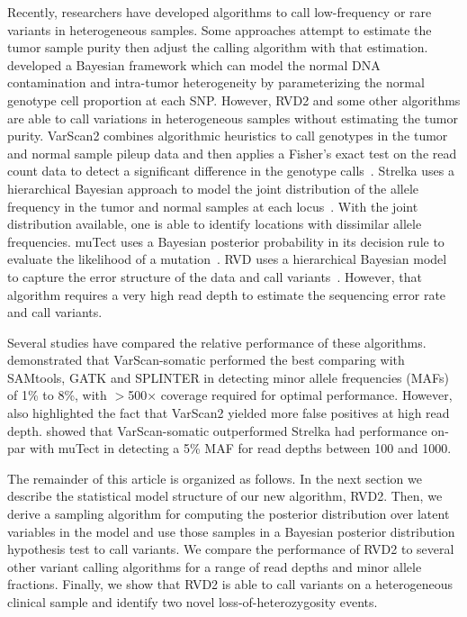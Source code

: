 \documentclass{bioinfo}
\begin{document}
Recently, researchers have developed algorithms to call low-frequency or rare variants in heterogeneous samples. Some approaches attempt to estimate the tumor sample purity then adjust the calling algorithm with that estimation.~\citet{yau2010statistical} developed a Bayesian framework which can model the normal DNA contamination and intra-tumor heterogeneity by parameterizing the normal genotype cell proportion at each SNP. However, RVD2 and some other algorithms are able to call variations in heterogeneous samples without estimating the tumor purity. VarScan2 combines algorithmic heuristics to call genotypes in the tumor and normal sample pileup data and then applies a Fisher's exact test on the read count data to detect a significant difference in the genotype calls~\citep{Koboldt:2012cg}. Strelka uses a hierarchical Bayesian approach to model the joint distribution of the allele frequency in the tumor and normal samples at each locus~\citep{Saunders:2012fh}. With the joint distribution available, one is able to identify locations with dissimilar allele frequencies. muTect uses a Bayesian posterior probability in its decision rule to evaluate the likelihood of a mutation~\citep{Cibulskis:2013ta}. RVD uses a hierarchical Bayesian model to capture the error structure of the data and call variants~\citep{Flaherty:2011ja, cushing2013rvd}. However, that algorithm requires a very high read depth to estimate the sequencing error rate and call variants.

Several studies have compared the relative performance of these algorithms. \citet{spencer2013performance} demonstrated  that VarScan-somatic performed the best comparing with SAMtools, GATK and SPLINTER in detecting minor allele frequencies (MAFs) of 1\% to 8\%, with $ > $500× coverage required for optimal performance. However, \citet{spencer2013performance} also highlighted the fact that VarScan2 yielded more false positives at high read depth. \citet{Stead:2013fu} showed that VarScan-somatic outperformed Strelka had performance on-par with muTect in detecting a 5\% MAF for read depths between 100 and 1000. %

The remainder of this article is organized as follows. In the next section we describe the statistical model structure of our new algorithm, RVD2. Then, we derive a sampling algorithm for computing the posterior distribution over latent variables in the model and use those samples in a Bayesian posterior distribution hypothesis test to call variants. We compare the performance of RVD2 to several other variant calling algorithms for a range of read depths and minor allele fractions. Finally, we show that RVD2 is able to call variants on a heterogeneous clinical sample and identify two novel loss-of-heterozygosity events. 
\end{document}

